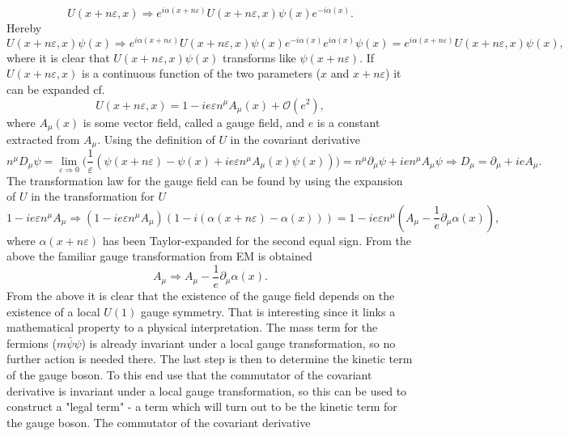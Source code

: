 \begin{equation}
	U(x+n\varepsilon,x)\Rightarrow e^{i\alpha(x+n\varepsilon)}U(x+n\varepsilon,x)\psi(x)e^{-i\alpha(x)}.
\end{equation} 
Hereby
\begin{equation}
	U(x+n\varepsilon,x)\psi(x)\Rightarrow e^{i\alpha(x+n\varepsilon)}U(x+n\varepsilon,x)\psi(x)e^{-i\alpha(x)}e^{i\alpha(x)}\psi(x)=e^{i\alpha(x+n\varepsilon)}U(x+n\varepsilon,x)\psi(x),
\end{equation} 
where it is clear that $U(x+n\varepsilon,x)\psi(x)$ transforms like $\psi(x+n\varepsilon)$. If $U(x+n\varepsilon,x)$ is a continuous function of the two parameters ($x$ and $x+n\varepsilon$) it can be expanded cf.
\begin{equation}
	U(x+n\varepsilon,x)=1-ie\varepsilon n^\mu A_\mu(x)+\mathcal{O}(e^2),
\end{equation}   
where $A_\mu(x)$ is some vector field, called a gauge field, and $e$ is a constant extracted from $A_\mu$. Using the definition of $U$ in the covariant derivative
\begin{equation}
	n^\mu D_\mu \psi=\lim\limits_{\varepsilon\Rightarrow 0}\bigg(\frac{1}{\varepsilon}(\psi(x+n\varepsilon)-\psi(x)+ie\varepsilon n^\mu A_\mu(x)\psi(x))\bigg)=n^\mu \partial_\mu\psi+ien^\mu A_\mu\psi\Rightarrow D_\mu=\partial_\mu+ieA_\mu.
\end{equation} 
The transformation law for the gauge field can be found by using the expansion of $U$ in the transformation for $U$
\begin{equation}
	1-ie\varepsilon n^\mu A_\mu\Rightarrow (1-ie\varepsilon n^\mu A_\mu)(1-i(\alpha(x+n\varepsilon)-\alpha(x)))=1-ie\varepsilon n^\mu (A_\mu-\frac{1}{e}\partial_\mu\alpha(x)),
\end{equation}  
where $\alpha(x+n\varepsilon)$ has been Taylor-expanded for the second equal sign. From the above the familiar gauge transformation from EM is obtained
\begin{equation}
	A_\mu\Rightarrow A_\mu-\frac{1}{e}\partial_\mu\alpha(x).
\end{equation} 
From the above it is clear that the existence of the gauge field depends on the existence of a local $U(1)$ gauge symmetry. That is interesting since it links a mathematical property to a physical interpretation. The mass term for the fermions ($m\bar{\psi}\psi$) is already invariant under a local gauge transformation, so no further action is needed there. The last step is then to determine the kinetic term of the gauge boson. To this end use that the commutator of the covariant derivative is invariant under a local gauge transformation, so this can be used to construct a "legal term" - a term which will turn out to be the kinetic term for the gauge boson. The commutator of the covariant derivative
